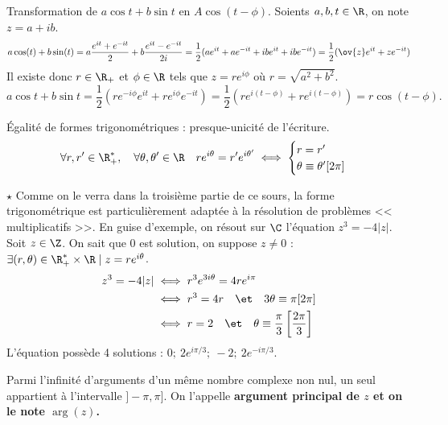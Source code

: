 \documentclass[11pt]{article}
\begin{document}
\begin{ex}{}{}
    Transformation de $a\cos t+b\sin t$ en $A\cos(t-\phi)$.
    \tcblower
    Soients $a,b,t\in\R$, on note $z=a+ib$.
    \begin{equation*}
        a\cos(t)+b\sin(t)=a\frac{e^{it}+e^{-it}}{2}+b\frac{e^{it}-e^{-it}}{2i}=\frac{1}{2}(ae^{it}+ae^{-it}+ibe^{it}+ibe^{-it})=\frac{1}{2}(\ov{z}e^{it}+ze^{-it})
    \end{equation*}
    Il existe donc $r\in\R_+$ et $\phi\in\R$ tels que $z=re^{i\phi}$ où $r=\sqrt{a^2+b^2}$.
    \begin{equation*}
        a\cos t + b\sin t=\frac{1}{2}(re^{-i\phi}e^{it}+re^{i\phi}e^{-it})=\frac{1}{2}(re^{i(t-\phi)}+re^{i(t-\phi)})=r\cos(t-\phi).
    \end{equation*}
\end{ex}

\begin{prop}{Égalité de formes trigonométriques : presque-unicité de l'écriture.}{}
    \begin{equation*}
        \forall r,r'\in\R_+^*,\quad \forall\theta,\theta'\in\R\quad re^{i\theta}=r'e^{i\theta'}\iff\begin{cases}r=r'\\\theta\equiv\theta'[2\pi]\end{cases}
    \end{equation*}
\end{prop}

\begin{ex}{$\star$}{}
    Comme on le verra dans la troisième partie de ce sours, la forme trigonométrique est particulièrement adaptée à la résolution de problèmes << multiplicatifs >>.\n
    En guise d'exemple, on résout sur $\C$ l'équation $z^3=-4|z|$.
    \tcblower
    Soit $z\in\Z$. On sait que $0$ est solution, on suppose $z\neq0$ : $\exists(r,\theta)\in\R_+^*\times\R\mid z=re^{i\theta}$.
    \begin{align*}
        z^3=-4|z|&\iff r^3e^{3i\theta} = 4re^{i\pi}\\
        &\iff r^3=4r\quad\et\quad 3\theta\equiv \pi[2\pi]\\
        &\iff r=2\quad\et\quad \theta\equiv\frac{\pi}{3}\left[\frac{2\pi}{3}\right]\\
    \end{align*}
    L'équation possède 4 solutions : $0;~2e^{i\pi/3};~-2;~2e^{-i\pi/3}$.
\end{ex}

\begin{defi}{}{}
    Parmi l'infinité d'arguments d'un même nombre complexe non nul, un seul appartient à l'intervalle $]-\pi,\pi]$. On l'appelle \bf{argument principal} de $z$ et on le note $\arg(z)$.
\end{defi}
\end{document}
